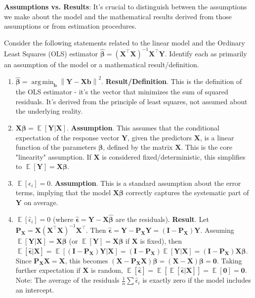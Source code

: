 \documentclass[11pt, a4paper]{article}
\DeclareMathOperator{\E}{\mathbb{E}}             %
\DeclareMathOperator{\argmin}{\mathrm{arg\,min}} %
\theoremstyle{definition}
\theoremstyle{remark}
\newcommand{\mat}[1]{\mathbf{#1}}       %
\newcommand{\vect}[1]{\bm{#1}}          %
\newcommand{\transpose}{^{\top}}        %
\newcommand{\norm}[1]{\left\| #1 \right\|} %
\begin{document}
\textbf{Assumptions vs. Results}:
It's crucial to distinguish between the assumptions we make about the model and the mathematical results derived from those assumptions or from estimation procedures.

Consider the following statements related to the linear model and the Ordinary Least Squares (OLS) estimator $\hat{\vect{\beta}} = (\mat{X}\transpose \mat{X})^{-1} \mat{X}\transpose \vect{Y}$. Identify each as primarily an assumption of the model or a mathematical result/definition.

\begin{enumerate}
    \item $\hat{\vect{\beta}} = \argmin_{\vect{b}} \norm{\vect{Y} - \mat{X}\vect{b}}^2$.
        \textbf{Result/Definition}. This is the definition of the OLS estimator - it's the vector that minimizes the sum of squared residuals. It's derived from the principle of least squares, not assumed about the underlying reality.
    \item $\mat{X}\vect{\beta} = \E[\vect{Y} | \mat{X}]$.
        \textbf{Assumption}. This assumes that the conditional expectation of the response vector $\vect{Y}$, given the predictors $\mat{X}$, is a linear function of the parameters $\vect{\beta}$, defined by the matrix $\mat{X}$. This is the core "linearity" assumption. If $\mat{X}$ is considered fixed/deterministic, this simplifies to $\E[\vect{Y}] = \mat{X}\vect{\beta}$.
    \item $\E[\epsilon_i] = 0$.
        \textbf{Assumption}. This is a standard assumption about the error terms, implying that the model $\mat{X}\vect{\beta}$ correctly captures the systematic part of $\vect{Y}$ on average.
    \item $\E[\hat{\epsilon}_i] = 0$ (where $\hat{\vect{\epsilon}} = \vect{Y} - \mat{X}\hat{\vect{\beta}}$ are the residuals).
        \textbf{Result}. Let $\mat{P}_{\mat{X}} = \mat{X}(\mat{X}\transpose \mat{X})^{-1}\mat{X}\transpose$. Then $\hat{\vect{\epsilon}} = \vect{Y} - \mat{P}_{\mat{X}}\vect{Y} = (\mat{I} - \mat{P}_{\mat{X}})\vect{Y}$. Assuming $\E[\vect{Y} | \mat{X}] = \mat{X}\vect{\beta}$ (or $\E[\vect{Y}] = \mat{X}\vect{\beta}$ if $\mat{X}$ is fixed), then $\E[\hat{\vect{\epsilon}} | \mat{X}] = \E[(\mat{I} - \mat{P}_{\mat{X}})\vect{Y} | \mat{X}] = (\mat{I} - \mat{P}_{\mat{X}}) \E[\vect{Y} | \mat{X}] = (\mat{I} - \mat{P}_{\mat{X}}) \mat{X}\vect{\beta}$. Since $\mat{P}_{\mat{X}}\mat{X} = \mat{X}$, this becomes $(\mat{X} - \mat{P}_{\mat{X}}\mat{X})\vect{\beta} = (\mat{X} - \mat{X})\vect{\beta} = \vect{0}$. Taking further expectation if $\mat{X}$ is random, $\E[\hat{\vect{\epsilon}}] = \E[\E[\hat{\vect{\epsilon}} | \mat{X}]] = \E[\vect{0}] = \vect{0}$. Note: The average of the residuals $\frac{1}{n} \sum \hat{\epsilon}_i$ is exactly zero if the model includes an intercept.

\end{enumerate}
\end{document}
